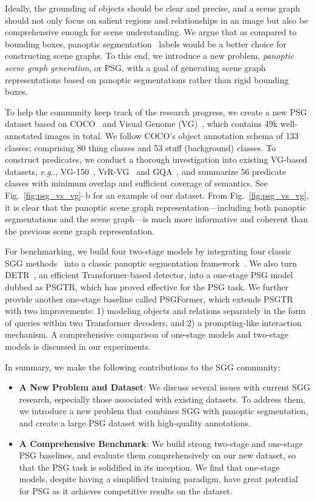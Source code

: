 \documentclass[runningheads]{llncs}
\makeatletter
\newcommand{\subfig}[1]{\textcolor{linkcolor}{-#1}}
\DeclareRobustCommand\onedot{\futurelet\@let@token\@onedot}
\def\@onedot{\ifx\@let@token.\else.\null\fi\xspace}
\def\eg{\emph{e.g}\onedot} \def\Eg{\emph{E.g}\onedot}
\makeatother
\begin{document}
Ideally, the grounding of objects should be clear and precise, and a scene graph should not only focus on salient regions and relationships in an image but also be comprehensive enough for scene understanding. We argue that as compared to bounding boxes, panoptic segmentation~\cite{panopticsegmentation} labels would be a better choice for constructing scene graphs. To this end, we introduce a new problem, \emph{panoptic scene graph generation}, or PSG, with a goal of generating scene graph representations based on panoptic segmentations rather than rigid bounding boxes.

To help the community keep track of the research progress, we create a new PSG dataset based on COCO~\cite{lin2014microsoft} and Visual Genome (VG)~\cite{vg17ijcv}, which contains 49k well-annotated images in total. We follow COCO's object annotation schema of 133 classes; comprising 80 thing classes and 53 stuff (background) classes. To construct predicates, we conduct a thorough investigation into existing VG-based datasets, \eg, VG-150~\cite{xu2017scene}, VrR-VG~\cite{liang2019vrr} and GQA~\cite{hudson2019gqa}, and summarize 56 predicate classes with minimum overlap and sufficient coverage of semantics. See Fig.~\ref{fig:psg_vs_vg}\subfig{-b} for an example of our dataset. From Fig.~\ref{fig:psg_vs_vg}, it is clear that the panoptic scene graph representation---including both panoptic segmentations and the scene graph---is much more informative and coherent than the previous scene graph representation.

For benchmarking, we build four two-stage models by integrating four classic SGG methods~\cite{xu2017scene,zellers2018neural,tang2018vctree,suhail2021energybased} into a classic panoptic segmentation framework~\cite{kirillov2019panoptic}. We also turn DETR~\cite{detr}, an efficient Transformer-based detector, into a one-stage PSG model dubbed as PSGTR, which has proved effective for the PSG task. We further provide another one-stage baseline called PSGFormer, which extends PSGTR with two improvements: 1) modeling objects and relations separately in the form of queries within two Transformer decoders, and 2) a prompting-like interaction mechanism. A comprehensive comparison of one-stage models and two-stage models is discussed in our experiments.

In summary, we make the following contributions to the SGG community:
\begin{itemize}
  \item \textbf{A New Problem and Dataset}: We discuss several issues with current SGG research, especially those associated with existing datasets. To address them, we introduce a new problem that combines SGG with panoptic segmentation, and create a large PSG dataset with high-quality annotations.
  \item \textbf{A Comprehensive Benchmark}: We build strong two-stage and one-stage PSG baselines, and evaluate them comprehensively on our new dataset, so that the PSG task is solidified in its inception.
  We find that one-stage models, despite having a simplified training paradigm, have great potential for PSG as it achieves competitive results on the dataset.
\end{itemize}
\end{document}
